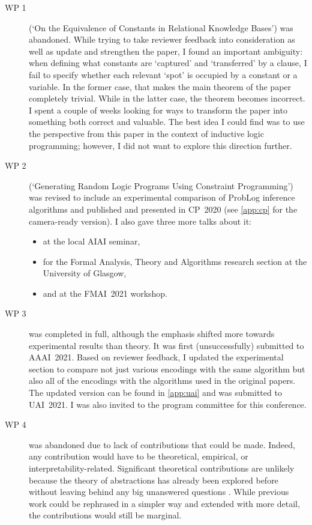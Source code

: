\documentclass{article}
\begin{document}
\begin{description}
\item[WP 1] (`On the Equivalence of Constants in Relational Knowledge Bases')
  was abandoned. While trying to take reviewer feedback into consideration as
  well as update and strengthen the paper, I found an important ambiguity: when
  defining what constants are `captured' and `transferred' by a clause, I fail
  to specify whether each relevant `spot' is occupied by a constant or a
  variable. In the former case, that makes the main theorem of the paper
  completely trivial. While in the latter case, the theorem becomes incorrect. I
  spent a couple of weeks looking for ways to transform the paper into something
  both correct and valuable. The best idea I could find was to use the
  perspective from this paper in the context of inductive logic programming;
  however, I did not want to explore this direction further.
\item[WP 2] (`Generating Random Logic Programs Using Constraint
  Programming') was revised to include an experimental comparison of ProbLog
  inference algorithms and published and presented in CP~2020 (see \cref{app:cp}
  for the camera-ready version). I also gave three more talks about it:
  \begin{itemize}
  \item at the local AIAI seminar,
  \item for the Formal Analysis, Theory and Algorithms research section at the
    University of Glasgow,
  \item and at the FMAI~2021 workshop.
  \end{itemize}
\item[WP 3] was completed in full, although the emphasis shifted more towards
  experimental results than theory. It was first (unsuccessfully) submitted to
  AAAI~2021. Based on reviewer feedback, I updated the experimental section to
  compare not just various encodings with the same algorithm but also all of the
  encodings with the algorithms used in the original papers. The updated version
  can be found in \cref{app:uai} and was submitted to UAI~2021. I was also
  invited to the program committee for this conference.
\item[WP 4] was abandoned due to lack of contributions that could be made.
  Indeed, any contribution would have to be theoretical, empirical, or
  interpretability-related. Significant theoretical contributions are unlikely
  because the theory of abstractions has already been explored before without
  leaving behind any big unanswered questions \cite{DBLP:journals/kbs/Belle20}.
  While previous work could be rephrased in a simpler way and extended with more
  detail, the contributions would still be marginal.


\end{description}
\end{document}

